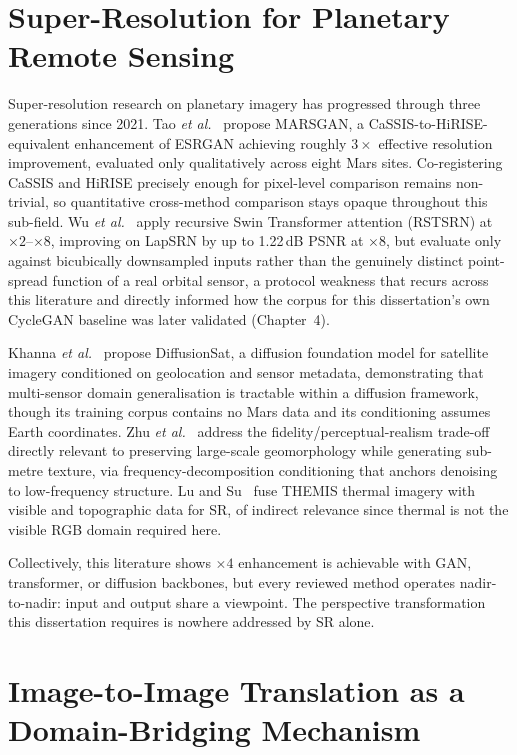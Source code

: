 \section{Super-Resolution for Planetary Remote Sensing}

Super-resolution research on planetary imagery has progressed through three generations since 2021. Tao \textit{et al.}~\cite{tao2021cassis} propose MARSGAN, a CaSSIS-to-HiRISE-equivalent enhancement of ESRGAN achieving roughly $3\times$ effective resolution improvement, evaluated only qualitatively across eight Mars sites. Co-registering CaSSIS and HiRISE precisely enough for pixel-level comparison remains non-trivial, so quantitative cross-method comparison stays opaque throughout this sub-field. Wu \textit{et al.}~\cite{wu2024rstsrn} apply recursive Swin Transformer attention (RSTSRN) at $\times2$--$\times8$, improving on LapSRN by up to 1.22\,dB PSNR at $\times8$, but evaluate only against bicubically downsampled inputs rather than the genuinely distinct point-spread function of a real orbital sensor, a protocol weakness that recurs across this literature and directly informed how the corpus for this dissertation's own CycleGAN baseline was later validated (Chapter~4).

Khanna \textit{et al.}~\cite{khanna2024diffusionsat} propose DiffusionSat, a diffusion foundation model for satellite imagery conditioned on geolocation and sensor metadata, demonstrating that multi-sensor domain generalisation is tractable within a diffusion framework, though its training corpus contains no Mars data and its conditioning assumes Earth coordinates. Zhu \textit{et al.}~\cite{zhu2025taming} address the fidelity/perceptual-realism trade-off directly relevant to preserving large-scale geomorphology while generating sub-metre texture, via frequency-decomposition conditioning that anchors denoising to low-frequency structure. Lu and Su~\cite{lu2025thermal} fuse THEMIS thermal imagery with visible and topographic data for SR, of indirect relevance since thermal is not the visible RGB domain required here.

Collectively, this literature shows $\times4$ enhancement is achievable with GAN, transformer, or diffusion backbones, but every reviewed method operates nadir-to-nadir: input and output share a viewpoint. The perspective transformation this dissertation requires is nowhere addressed by SR alone.

\section{Image-to-Image Translation as a Domain-Bridging Mechanism}

